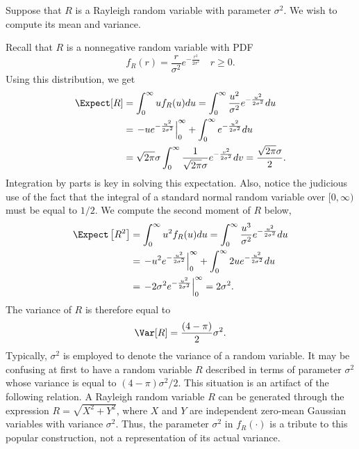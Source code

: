\begin{example}
Suppose that $R$ is a Rayleigh random variable with parameter $\sigma^2$.
We wish to compute its mean and variance.

Recall that $R$ is a nonnegative random variable with PDF
\begin{equation*}
f_R (r) = \frac{r}{\sigma^2} e^{- \frac{r^2}{2 \sigma^2} } \quad r \geq 0 .
\end{equation*}
Using this distribution, we get
\begin{equation*}
\begin{split}
\Expect [R] &= \int_0^{\infty} u f_R(u) du
= \int_0^{\infty} \frac{u^2}{\sigma^2} e^{- \frac{u^2}{2 \sigma^2}} du \\
&= \left. - u e^{- \frac{u^2}{2 \sigma^2}} \right|_0^{\infty}
+ \int_0^{\infty} e^{- \frac{u^2}{2 \sigma^2}} du \\
&= \sqrt{ 2 \pi } \sigma
\int_0^{\infty} \frac{1}{\sqrt{2 \pi} \sigma} e^{- \frac{v^2}{2 \sigma^2}} dv
= \frac{\sqrt{2 \pi} \sigma}{2} .
\end{split}
\end{equation*}
Integration by parts is key in solving this expectation.
Also, notice the judicious use of the fact that the integral of a standard normal random variable over $[0, \infty)$ must be equal to $1/2$.
We compute the second moment of $R$ below,
\begin{equation*}
\begin{split}
\Expect \left[ R^2 \right] &= \int_0^{\infty} u^2 f_R(u) du
= \int_0^{\infty} \frac{u^3}{\sigma^2} e^{- \frac{u^2}{2 \sigma^2}} du \\
&= \left. - u^2 e^{- \frac{u^2}{2 \sigma^2}} \right|_0^{\infty}
+ \int_0^{\infty} 2 u e^{- \frac{u^2}{2 \sigma^2}} du \\
&= \left. - 2 \sigma^2 e^{- \frac{u^2}{2 \sigma^2}} \right|_0^{\infty}
= 2 \sigma^2 .
\end{split}
\end{equation*}
The variance of $R$ is therefore equal to
\begin{equation*}
\Var [R] = \frac{(4 - \pi)}{2} \sigma^2 .
\end{equation*}
Typically, $\sigma^2$ is employed to denote the variance of a random variable.
It may be confusing at first to have a random variable $R$ described in terms of parameter $\sigma^2$ whose variance is equal to $(4 - \pi) \sigma^2/2$.
This situation is an artifact of the following relation.
A Rayleigh random variable $R$ can be generated through the expression $R = \sqrt{X^2 + Y^2}$, where $X$ and $Y$ are independent zero-mean Gaussian variables with variance $\sigma^2$.
Thus, the parameter $\sigma^2$ in $f_R (\cdot)$ is a tribute to this popular construction, not a representation of its actual variance.
\end{example}


